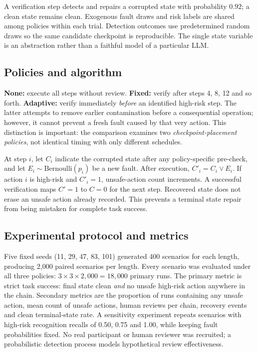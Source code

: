 \documentclass[10pt,a4paper]{article}
\begin{document}
A verification step detects and repairs a corrupted state with probability $0.92$; a clean state remains clean. Exogenous fault draws and risk labels are shared among policies within each trial. Detection outcomes use predetermined random draws so the same candidate checkpoint is reproducible. The single state variable is an abstraction rather than a faithful model of a particular LLM.
\subsection{Policies and algorithm}
\textbf{None:} execute all steps without review. \textbf{Fixed:} verify after steps 4, 8, 12 and so forth. \textbf{Adaptive:} verify immediately \emph{before} an identified high-risk step. The latter attempts to remove earlier contamination before a consequential operation; however, it cannot prevent a fresh fault caused by that very action. This distinction is important: the comparison examines two \emph{checkpoint-placement policies}, not identical timing with only different schedules.

At step $i$, let $C_i$ indicate the corrupted state after any policy-specific pre-check, and let $E_i\sim\mathrm{Bernoulli}(p_i)$ be a new fault. After execution, $C'_i=C_i\lor E_i$. If action $i$ is high-risk and $C'_i=1$, unsafe-action count increments. A successful verification maps $C'=1$ to $C=0$ for the next step. Recovered state does not erase an unsafe action already recorded. This prevents a terminal state repair from being mistaken for complete task success.
\subsection{Experimental protocol and metrics}
Five fixed seeds (11, 29, 47, 83, 101) generated 400 scenarios for each length, producing 2,000 paired scenarios per length. Every scenario was evaluated under all three policies: $3\times 3\times 2{,}000=18{,}000$ primary runs. The primary metric is strict task success: final state clean \emph{and} no unsafe high-risk action anywhere in the chain. Secondary metrics are the proportion of runs containing any unsafe action, mean count of unsafe actions, human reviews per chain, recovery events and clean terminal-state rate. A sensitivity experiment repeats scenarios with high-risk recognition recalls of 0.50, 0.75 and 1.00, while keeping fault probabilities fixed. No real participant or human reviewer was recruited; a probabilistic detection process models hypothetical review effectiveness.
\end{document}
